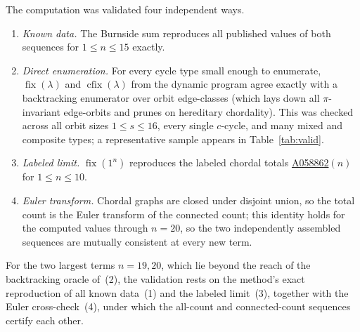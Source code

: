 \documentclass[11pt]{article}
\theoremstyle{plain}
\theoremstyle{definition}
\DeclareMathOperator{\fix}{fix}
\DeclareMathOperator{\cfix}{cfix}
\begin{document}
The computation was validated four independent ways.
\begin{enumerate}[topsep=2pt,itemsep=1pt]
\item \emph{Known data.} The Burnside sum reproduces all published values of both sequences for
$1\le n\le 15$ exactly.
\item \emph{Direct enumeration.} For every cycle type small enough to enumerate, $\fix(\lambda)$ and
$\cfix(\lambda)$ from the dynamic program agree exactly with a backtracking enumerator over orbit
edge-classes (which lays down all $\pi$-invariant edge-orbits and prunes on hereditary chordality).
This was checked across all orbit sizes $1\le s\le 16$, every single $c$-cycle, and many mixed and
composite types; a representative sample appears in Table~\ref{tab:valid}.
\item \emph{Labeled limit.} $\fix(1^n)$ reproduces the labeled chordal totals
\href{https://oeis.org/A058862}{A058862}$(n)$ for $1\le n\le 10$.
\item \emph{Euler transform.} Chordal graphs are closed under disjoint union, so the total count is
the Euler transform of the connected count; this identity holds for the computed values through
$n=20$, so the two independently assembled sequences are mutually consistent at every new term.
\end{enumerate}
For the two largest terms $n=19,20$, which lie beyond the reach of the backtracking oracle of~(2), the
validation rests on the method's exact reproduction of all known data~(1) and the labeled limit~(3),
together with the Euler cross-check~(4), under which the all-count and connected-count sequences
certify each other.
\end{document}
